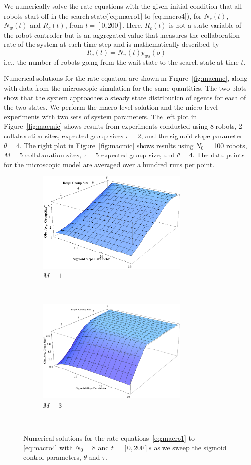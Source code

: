 \documentclass[Main.tex]{subfiles}
\begin{document}
We numerically solve the rate equations with the given initial condition that all robots start off in the search state(\eqref{eq:macro1} to \eqref{eq:macro4}), for $N_s(t)$, $N_w(t)$ and $R_c(t)$, from $t = [0, 200]$. Here, $R_c(t)$ is not a state variable of the robot controller but is an aggregated value that measures the collaboration rate of the system at each time step and is mathematically described by
\begin{equation}
R_c(t) = N_w(t)p_{ws}(\sigma)
\end{equation}
i.e., the number of robots going from the wait state to the search state at time $t$.

Numerical solutions for the rate equation are shown in Figure~\ref{fig:macmic}, along with data from the microscopic simulation for the same quantities. The two plots show that the system approaches a steady state distribution of agents for each of the two states. We perform the macro-level solution and the micro-level experiments with two sets of system parameters. The left plot in Figure~\ref{fig:macmic} shows results from experiments conducted using 8 robots, 2 collaboration sites, expected group sizes $\tau = 2$, and the sigmoid slope parameter $\theta = 4$. The right plot in Figure~\ref{fig:macmic} shows results using $N_0$ = 100 robots, $M = 5$ collaboration sites, $\tau = 5$ expected group size, and $\theta = 4$. The data points for the microscopic model are averaged over a hundred runs per point.


\begin{figure}[!ht]
\centering\begin{subfigure}{7.5cm}
\centering\includegraphics[width=7.5cm]{macroSweepM1.png}
\caption{$M = 1$}\label{}
\end{subfigure}~
\centering\begin{subfigure}{7.5cm}
\centering\includegraphics[width=7.5cm]{macroSweepM3.png}
\caption{$M = 3$}\label{}
\end{subfigure}~
\caption{Numerical solutions for the rate equations~\eqref{eq:macro1} to \eqref{eq:macro4} with $N_0 = 8$ and $t = [0, 200]s$ as we sweep the sigmoid control parameters, $\theta$ and $\tau$.}\label{fig:sweeps}
\end{figure}
\end{document}
